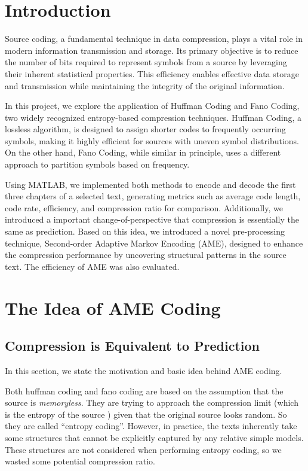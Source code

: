 \documentclass[12pt,twoside]{article}
\begin{document}
\section{Introduction}

Source coding, a fundamental technique in data compression, plays a vital role in modern information transmission and storage. Its primary objective is to reduce the number of bits required to represent symbols from a source by leveraging their inherent statistical properties. This efficiency enables effective data storage and transmission while maintaining the integrity of the original information.

In this project, we explore the application of Huffman Coding and Fano Coding, two widely recognized entropy-based compression techniques. Huffman Coding, a lossless algorithm, is designed to assign shorter codes to frequently occurring symbols, making it highly efficient for sources with uneven symbol distributions. On the other hand, Fano Coding, while similar in principle, uses a different approach to partition symbols based on frequency.

Using MATLAB, we implemented both methods to encode and decode the first three chapters of a selected text, generating metrics such as average code length, code rate, efficiency, and compression ratio for comparison. Additionally, we introduced a important change-of-perspective that compression is essentially the same as prediction. Based on this idea, we introduced a novel pre-processing technique, Second-order Adaptive Markov Encoding (AME), designed to enhance the compression performance by uncovering structural patterns in the source text. The efficiency of AME was also evaluated.


\section{The Idea of AME Coding}

\subsection{Compression is Equivalent to Prediction}

In this section, we state the motivation and basic idea behind AME coding. 

Both huffman coding and fano coding are based on the assumption that the source is \textit{memoryless}. They are trying to approach the compression limit (which is the entropy of the source \cite{ref1}) given that the original source looks random. So they are called ``entropy coding''. However, in practice, the texts inherently take some structures that cannot be explicitly captured by any relative simple models. These structures are not considered when performing entropy coding, so we wasted some potential compression ratio.
\end{document}

